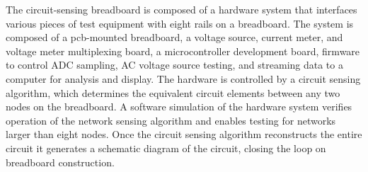 \documentclass[11pt,twoside]{mitthesis}
\begin{document}
The circuit-sensing breadboard is composed of a hardware system that interfaces various pieces of test equipment with eight rails on a breadboard.
The system is composed of a pcb-mounted breadboard, a voltage source, current meter, and voltage meter multiplexing board, a microcontroller development board, firmware to control ADC sampling, AC voltage source testing, and streaming data to a computer for analysis and display.
The hardware is controlled by a circuit sensing algorithm, which determines the equivalent circuit elements between any two nodes on the breadboard.
A software simulation of the hardware system verifies operation of the network sensing algorithm and enables testing for networks larger than eight nodes.
Once the circuit sensing algorithm reconstructs the entire circuit it generates a schematic diagram of the circuit, closing the loop on breadboard construction.


\ifdefined\DEBUG
\end{document}
